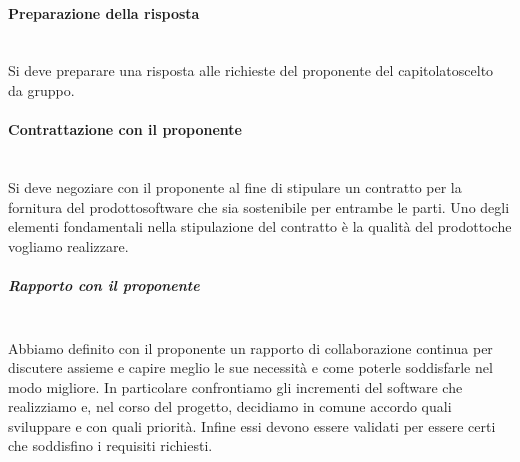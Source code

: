 			\paragraph{Preparazione della risposta}\mbox{}\\ [1mm]
				Si deve preparare una risposta alle richieste del proponente del capitolato\glosp scelto da gruppo.
			\paragraph{Contrattazione con il proponente}\mbox{}\\ [1mm]
				Si deve negoziare con il proponente al fine di stipulare un contratto per la fornitura del prodotto\glosp software che sia sostenibile per entrambe le parti. Uno degli elementi fondamentali nella stipulazione del contratto è la qualità del prodotto\glosp che vogliamo realizzare.
				\subparagraph*{Rapporto con il proponente}\mbox{}\\ [1mm]
				Abbiamo definito con il proponente un rapporto di collaborazione continua per discutere assieme e capire meglio le sue necessità e come poterle soddisfarle nel modo migliore.
				In particolare confrontiamo gli incrementi del software che realizziamo e, nel corso del progetto, decidiamo in comune accordo quali sviluppare e con quali priorità. Infine essi devono essere validati per essere certi che soddisfino i requisiti richiesti.
